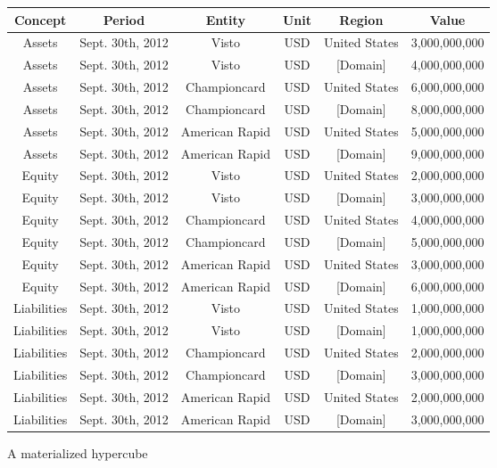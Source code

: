 \documentclass{acm_proc_article-sp}
\begin{document}
\begin{figure*}
\caption{A materialized hypercube}
\label{fig-materialized}
\begin{tabular}{|c|c|c|c|c||c|}
\hline
Concept & Period & Entity & Unit & Region & Value \\
\hline
Assets & Sept. 30th, 2012 & Visto & USD & United States & 3,000,000,000 \\
Assets & Sept. 30th, 2012 & Visto & USD & [Domain] & 4,000,000,000 \\
Assets & Sept. 30th, 2012 & Championcard & USD & United States & 6,000,000,000 \\
Assets & Sept. 30th, 2012 & Championcard & USD & [Domain] & 8,000,000,000 \\
Assets & Sept. 30th, 2012 & American Rapid & USD & United States & 5,000,000,000 \\
Assets & Sept. 30th, 2012 & American Rapid & USD & [Domain] & 9,000,000,000 \\
Equity & Sept. 30th, 2012 & Visto & USD & United States & 2,000,000,000 \\
Equity & Sept. 30th, 2012 & Visto &USD &  [Domain] & 3,000,000,000 \\
Equity & Sept. 30th, 2012 & Championcard & USD & United States & 4,000,000,000 \\
Equity & Sept. 30th, 2012 & Championcard & USD & [Domain] & 5,000,000,000 \\
Equity & Sept. 30th, 2012 & American Rapid & USD & United States & 3,000,000,000 \\
Equity & Sept. 30th, 2012 & American Rapid & USD & [Domain] & 6,000,000,000 \\
Liabilities & Sept. 30th, 2012 & Visto & USD & United States & 1,000,000,000 \\
Liabilities & Sept. 30th, 2012 & Visto & USD & [Domain] & 1,000,000,000 \\
Liabilities & Sept. 30th, 2012 & Championcard & USD & United States & 2,000,000,000 \\
Liabilities & Sept. 30th, 2012 & Championcard & USD & [Domain] & 3,000,000,000 \\
Liabilities & Sept. 30th, 2012 & American Rapid & USD & United States & 2,000,000,000 \\
Liabilities & Sept. 30th, 2012 & American Rapid & USD & [Domain] & 3,000,000,000 \\
\hline
\end{tabular}
\end{figure*}
\end{document}
